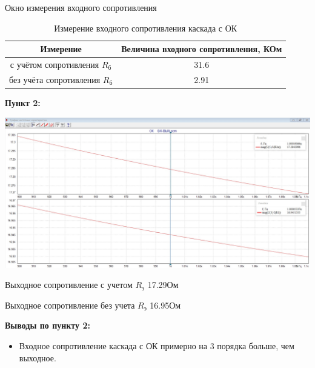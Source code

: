 \documentclass[a4paper,14pt]{extarticle}
\begin{document}
    Окно измерения входного сопротивления 
    \begin{table}[ht]
        \begin{center}
            \caption{Измерение входного сопротивления каскада с ОК}
            \begin{tabular}{ |c|c| }
                \hline
                Измерение & Величина входного сопротивления, КОм\\
                \hline
                с учётом сопротивления $R_{\text{б}}$ & 31.6\\
                \hline
                без учёта сопротивления $R_{\text{б}}$ & 2.91\\
                \hline
            \end{tabular}
        \end{center}
    \end{table}

    \newpage
    \textbf{Пункт 2:}
    \begin{center}
        \includegraphics[scale=0.25]{2.jpg}
    \end{center}

    Выходное сопротивление с учетом $R_{\text{э}}$ 17.29Ом

    Выходное сопротивление без учета $R_{\text{э}}$ 16.95Ом

    \textbf{Выводы по пункту 2:}
    \vspace{-6ex}
    \begin{singlespace}
        \begin{itemize}
            \item Входное сопротивление каскада с ОК примерно на 3 порядка больше, чем выходное.
        \end{itemize}
    \end{singlespace}
\end{document}
